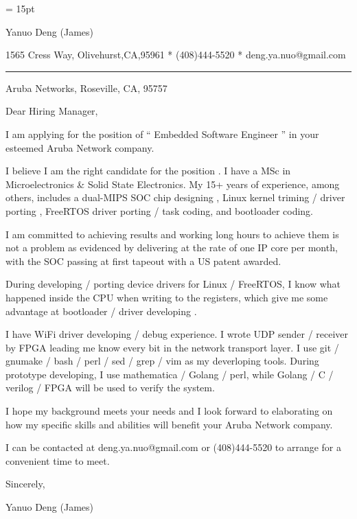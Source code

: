 

  \FFrg \baselineskip = 15pt

{
Yanuo Deng (James)
}

{ 
1565 Cress Way, Olivehurst,CA,95961
*
(408)444-5520
*
deng.ya.nuo@gmail.com
}

{ \smallbreak } 

{\par\noindent\hrule} 

{ \bigbreak } 


Aruba Networks, Roseville, CA, 95757

{ 
Dear Hiring Manager,
}

{ \bigbreak } 
I am applying for the position of `` Embedded Software Engineer '' in your esteemed Aruba Network company.

{ \bigbreak } 
I believe I am the right candidate for the position .
I have a MSc in Microelectronics \& Solid State Electronics.
My 15+ years of experience, among others, 
includes a dual-MIPS SOC chip designing ,
Linux kernel triming  /  driver porting , 
FreeRTOS driver porting  /  task coding,
and bootloader coding.

{ \bigbreak } 
I am committed to achieving results and working long hours 
to achieve them is not a problem as evidenced by 
delivering at the rate of one IP core per month,
with the SOC passing at first tapeout
with a US patent awarded.

{ \bigbreak } 
During developing  /  porting device drivers for Linux / FreeRTOS,
I know what happened inside the CPU when writing to the registers,
which give me some advantage at bootloader  /  driver developing .

{ \bigbreak } 
I have WiFi driver developing / debug experience. 
I wrote UDP sender / receiver by FPGA leading me know every bit in the network transport layer.
I use git  /  gnumake  /  bash  /  perl  /  sed  /  grep  /  vim as my deverloping tools.
During prototype developing, I use mathematica / Golang / perl, 
while Golang / C / verilog / FPGA will be used to verify the system.

{ \bigbreak } 
I hope my background meets your needs and I look
forward to elaborating on how my specific skills and abilities will benefit your Aruba Network company.

{ \bigbreak } 
I can be contacted at deng.ya.nuo@gmail.com
or (408)444-5520 to arrange for a convenient time to meet.

{ \bigbreak } 




\vskip 60pt

{ \bigbreak } 
Sincerely,

Yanuo Deng (James)

\bye
